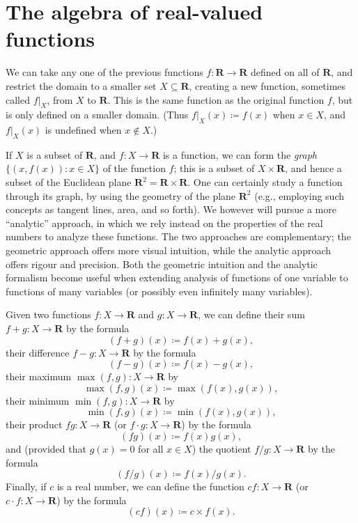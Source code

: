 \section{The algebra of real-valued functions}\label{sec 9.2}

\begin{note}
    We can take any one of the previous functions \(f : \mathbf{R} \to \mathbf{R}\) defined on all of \(\mathbf{R}\), and restrict the domain to a smaller set \(X \subseteq \mathbf{R}\), creating a new function, sometimes called \(f|_X\), from \(X\) to \(\mathbf{R}\).
    This is the same function as the original function \(f\), but is only defined on a smaller domain.
    (Thus \(f|_X(x) \coloneqq f(x)\) when \(x \in X\), and \(f|_X(x)\) is undefined when \(x \notin X\).)
\end{note}

\begin{note}
    If \(X\) is a subset of \(\mathbf{R}\), and \(f : X \to \mathbf{R}\) is a function, we can form the \emph{graph} \(\{(x, f(x)) : x \in X\}\) of the function \(f\);
    this is a subset of \(X \times \mathbf{R}\), and hence a subset of the Euclidean plane \(\mathbf{R}^2 = \mathbf{R} \times \mathbf{R}\).
    One can certainly study a function through its graph, by using the geometry of the plane \(\mathbf{R}^2\)
    (e.g., employing such concepts as tangent lines, area, and so forth).
    We however will pursue a more ``analytic'' approach, in which we rely instead on the properties of the real numbers to analyze these functions.
    The two approaches are complementary;
    the geometric approach offers more visual intuition, while the analytic approach offers rigour and precision.
    Both the geometric intuition and the analytic formalism become useful when extending analysis of functions of one variable to functions of many variables
    (or possibly even infinitely many variables).
\end{note}

\begin{definition}\label{9.2.1}
    Given two functions \(f : X \to \mathbf{R}\) and \(g : X \to \mathbf{R}\), we can define their sum \(f + g : X \to \mathbf{R}\) by the formula
    \[
        (f + g)(x) \coloneqq f(x) + g(x),
    \]
    their difference \(f - g : X \to \mathbf{R}\) by the formula
    \[
        (f - g)(x) \coloneqq f(x) - g(x),
    \]
    their maximum \(\max(f, g) : X \to \mathbf{R}\) by
    \[
        \max(f, g)(x) \coloneqq \max(f(x), g(x)),
    \]
    their minimum \(\min(f, g) : X \to \mathbf{R}\) by
    \[
        \min(f, g)(x) \coloneqq \min(f(x), g(x)),
    \]
    their product \(fg : X \to \mathbf{R}\) (or \(f \cdot g : X \to \mathbf{R}\)) by the formula
    \[
        (fg)(x) \coloneqq f(x)g(x),
    \]
    and (provided that \(g(x) = 0\) for all \(x \in X\)) the quotient \(f / g : X \to \mathbf{R}\) by the formula
    \[
        (f / g)(x) \coloneqq f(x) / g(x).
    \]
    Finally, if \(c\) is a real number, we can define the function \(cf : X \to \mathbf{R}\) (or \(c \cdot f : X \to \mathbf{R}\)) by the formula
    \[
        (cf)(x) \coloneqq c \times f(x).
    \]
\end{definition}

